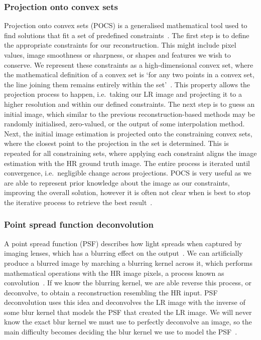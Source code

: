 \subsubsection{Projection onto convex sets}
Projection onto convex sets (POCS) is a generalised mathematical tool used to find solutions that fit a set of predefined constraints~\cite{pocs,pocsEndoscopy}. The first step is to define the appropriate constraints for our reconstruction. This might include pixel values, image smoothness or sharpness, or shapes and features we wish to conserve. We represent these constraints as a high-dimensional convex set, where the mathematical definition of a convex set is `for any two points in a convex set, the line joining them remains entirely within the set'~\cite{pocsEndoscopy}. This property allows the projection process to happen, i.e.\ taking our LR image and projecting it to a higher resolution and within our defined constraints. The next step is to guess an initial image, which similar to the previous reconstruction-based methods may be randomly initialised, zero-valued, or the output of some interpolation method. Next, the initial image estimation is projected onto the constraining convex sets, where the closest point to the projection in the set is determined. This is repeated for all constraining sets, where applying each constraint aligns the image estimation with the HR ground truth image. The entire process is iterated until convergence, i.e.\ negligible change across projections. POCS is very useful as we are able to represent prior knowledge about the image as our constraints, improving the overall solution, however it is often not clear when is best to stop the iterative process to retrieve the best result~\cite{pocsEndoscopy}.

\subsubsection{Point spread function deconvolution}
A point spread function (PSF) describes how light spreads when captured by imaging lenses, which has a blurring effect on the output~\cite{psfDeconv}. We can artificially produce a blurred image by marching a blurring kernel across it, which performs mathematical operations with the HR image pixels, a process known as convolution~\cite{convBlur}. If we know the blurring kernel, we are able reverse this process, or deconvolve, to obtain a reconstruction resembling the HR input. PSF deconvolution uses this idea and deconvolves the LR image with the inverse of some blur kernel that models the PSF that created the LR image. We will never know the exact blur kernel we must use to perfectly deconvolve an image, so the main difficulty becomes deciding the blur kernel we use to model the PSF~\cite{pocs}.

